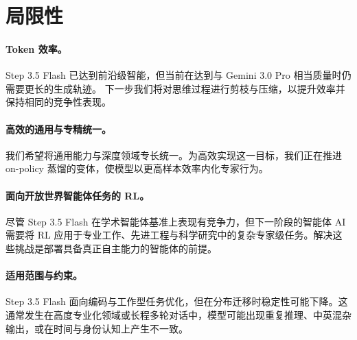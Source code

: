 \section{局限性}
\label{sec:limitation}

\paragraph{Token 效率。}
Step 3.5 Flash 已达到前沿级智能，但当前在达到与 Gemini 3.0 Pro 相当质量时仍需要更长的生成轨迹。
下一步我们将对思维过程进行剪枝与压缩，以提升效率并保持相同的竞争性表现。


\paragraph{高效的通用与专精统一。}
我们希望将通用能力与深度领域专长统一。为高效实现这一目标，我们正在推进 on-policy 蒸馏的变体，使模型以更高样本效率内化专家行为。


\paragraph{面向开放世界智能体任务的 RL。}

尽管 Step 3.5 Flash 在学术智能体基准上表现有竞争力，但下一阶段的智能体 AI 需要将 RL 应用于专业工作、先进工程与科学研究中的复杂专家级任务。解决这些挑战是部署具备真正自主能力的智能体的前提。

\paragraph{适用范围与约束。}
Step 3.5 Flash 面向编码与工作型任务优化，但在分布迁移时稳定性可能下降。这通常发生在高度专业化领域或长程多轮对话中，模型可能出现重复推理、中英混杂输出，或在时间与身份认知上产生不一致。